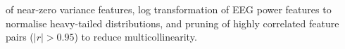 \documentclass{ieeetj}
\begin{document}
of near-zero variance features, log transformation of EEG power features to normalise heavy-tailed distributions, and pruning of highly correlated feature pairs ($|r| > 0.95$) to reduce multicollinearity.



\end{document}
